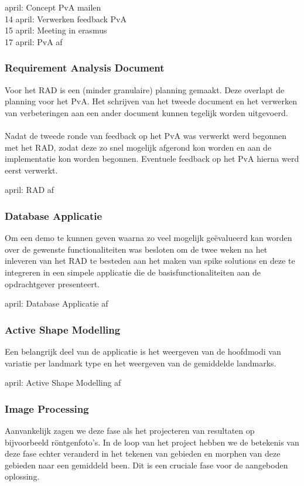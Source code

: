  april: Concept PvA mailen \\
14 april: Verwerken feedback PvA \\
15 april: Meeting in erasmus \\
17 april: PvA af

\subsubsection{Requirement Analysis Document}
Voor het RAD is een (minder granulaire) planning gemaakt. Deze overlapt
de planning voor het PvA. Het schrijven van het tweede document en
het verwerken van verbeteringen aan een ander document kunnen tegelijk worden
uitgevoerd.
\\
\\
Nadat de tweede ronde van feedback op het PvA was verwerkt werd begonnen met
het RAD, zodat deze zo snel mogelijk afgerond kon worden en aan de
implementatie kon worden begonnen. Eventuele feedback op het PvA hierna werd
eerst verwerkt.

 april: RAD af

\subsubsection{Database Applicatie}
Om een demo te kunnen geven waarna zo veel mogelijk ge\"{e}valueerd kan worden
over de gewenste functionaliteiten was besloten om de twee weken na het
inleveren van het RAD te besteden aan het maken van spike solutions en deze te
integreren in een simpele applicatie die de basisfunctionaliteiten aan de
opdrachtgever presenteert.

 april: Database Applicatie af

\subsubsection{Active Shape Modelling}
Een belangrijk deel van de applicatie is het weergeven van de hoofdmodi van
variatie per landmark type en het weergeven van de gemiddelde landmarks.

 april: Active Shape Modelling af

\subsubsection{Image Processing}
Aanvankelijk zagen we deze fase als het projecteren van resultaten op
bijvoorbeeld r\"{o}ntgenfoto's. In de loop van het project hebben we de
betekenis van deze fase echter veranderd in het tekenen van gebieden en
morphen van deze gebieden naar een gemiddeld been. Dit is een cruciale fase
voor de aangeboden oplossing.

